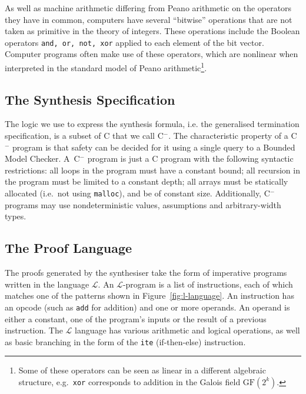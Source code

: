 \documentclass[preprint]{sigplanconf}
\theoremstyle{definition}
\newcommand{\newC}{C$^-$\xspace}
\begin{document}

As well as machine arithmetic differing from Peano arithmetic on the
operators they have in common, computers have several ``bitwise'' operations
that are not taken as primitive in the theory of integers.  These operations
include the Boolean operators \texttt{and, or, not, xor} applied to each
element of the bit vector.  Computer programs often make use of these
operators, which are nonlinear when interpreted in the standard model of
Peano arithmetic\footnote{Some of these operators can be seen as
linear in a different algebraic structure, e.g.~\texttt{xor} corresponds to
addition in the Galois field $\mathrm{GF}(2^k)$.}.

\subsection{The Synthesis Specification}

The logic we use to express the synthesis formula, i.e.
the generalised termination specification, is a subset of C that we call
\newC.  The characteristic property of a \newC program is that safety can be
decided for it using a single query to a Bounded Model Checker.  A~\newC
program is just a C program with the following syntactic restrictions:
 all loops in the program must have a constant bound;
 all recursion in the program must be limited to a constant depth;
 all arrays must be statically allocated (i.e.~not using \texttt{malloc}),
 and be of constant size.
Additionally, \newC programs may use nondeterministic values, assumptions
and arbitrary-width types.

\subsection{The Proof Language}

The proofs generated by the synthesiser take the form of imperative programs
written in the language $\mathcal{L}$.  An $\mathcal{L}$-program is a list
of instructions, each of which matches one of the patterns shown in
Figure~\ref{fig:l-language}.  An instruction has an opcode (such as
\verb|add| for addition) and one or more operands.  An operand is either a
constant, one of the program's inputs or the result of a previous
instruction.  The $\mathcal{L}$ language has various arithmetic and logical
operations, as well as basic branching in the form of the \verb|ite|
(if-then-else) instruction.
\end{document}
